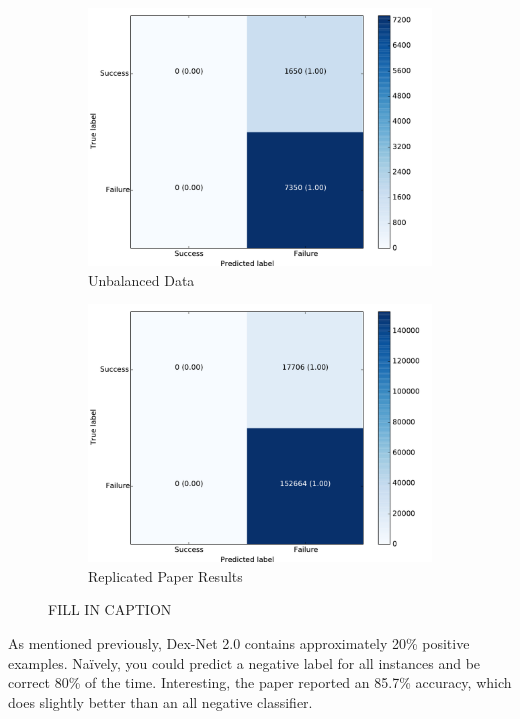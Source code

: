 \begin{figure}[t!]
\begin{subfigure}[t]{0.24\textwidth}
        \includegraphics[width=0.9\columnwidth]{figs/unbalanced_results.pdf} \caption{Unbalanced Data} \label{fig:unbalanced_confusion}
        \end{subfigure}
    \begin{subfigure}[t]{0.24\textwidth}
        \includegraphics[width=0.9\columnwidth]{figs/paper_original.pdf} \caption{Replicated Paper Results} \label{fig:from_paper}
    \end{subfigure}
\caption{FILL IN CAPTION} \label{fig:confusion_matrices}
\end{figure}

As mentioned previously, Dex-Net 2.0 contains approximately 20\% positive examples. 
Na{\"i}vely, you could predict a negative label for all instances and be correct 80\% of the time. Interesting, the paper reported an 85.7\% accuracy, which does slightly better than an all negative classifier. 


